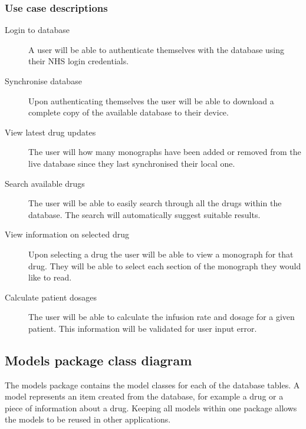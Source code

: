 \documentclass[11pt,fleqn,twoside]{article}
\begin{document}
\subsubsection{Use case descriptions}
\begin{description}
	\item[Login to database]  A user will be able to authenticate themselves with the database using their NHS login credentials.
	\item[Synchronise database] Upon authenticating themselves the user will be able to download a complete copy of the available database to their device.
	\item[View latest drug updates] The user will how many monographs have been added or removed from the live database since they last synchronised their local one.
	\item[Search available drugs] The user will be able to easily search through all the drugs within the database. The search will automatically suggest suitable results.
	\item[View information on selected drug] Upon selecting a drug the user will be able to view a monograph for that drug. They will be able to select each section of the monograph they would like to read.
	\item[Calculate patient dosages] The user will be able to calculate the infusion rate and dosage for a given patient. This information will be validated for user input error. 
\end{description}

\subsection{Models package class diagram}
The models package contains the model classes for each of the database tables. A model represents an item created from the database, for example a drug or a piece of information about a drug. Keeping all models within one package allows the models to be reused in other applications.
\end{document}
